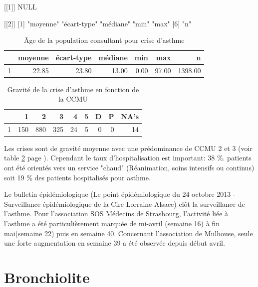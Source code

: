 \documentclass[12pt,english,french,twoside]{book}\usepackage[]{graphicx}\usepackage[]{color}
\begin{document}
[[1]]
NULL

[[2]]
[1] "moyenne"    "écart-type" "médiane"    "min"        "max"       
[6] "n"         

\begin{table}[ht]
\centering
\begin{tabular}{rrrrrrr}
  \hline
 & moyenne & écart-type & médiane & min & max & n \\ 
  \hline
1 & 22.85 & 23.80 & 13.00 & 0.00 & 97.00 & 1398.00 \\ 
   \hline
\end{tabular}
\caption[Asthme et âge]{Âge de la population consultant pour crise d'asthme} 
\label{tab:age_asthme}
\end{table}
\begin{table}[ht]
\centering
\begin{tabular}{rrrrrrrrr}
  \hline
 & 1 & 2 & 3 & 4 & 5 & D & P & NA's \\ 
  \hline
1 & 150 & 880 & 325 &  24 &   5 &   0 &   0 &  14 \\ 
   \hline
\end{tabular}
\caption[Asthme et CCMU]{Gravité de la crise d'asthme en fonction de la CCMU} 
\label{tab:ccmu_asthme}
\end{table}


Les crises sont de gravité moyenne avec une prédominance de CCMU 2 et 3 (voir table \ref{tab:ccmu_asthme} page \pageref{tab:ccmu_asthme}).
Cependant le taux d'hospitalisation est important: 38 \%.
 patients ont été orientés vers un service "chaud" (Réanimation, soins intensifs ou continus) soit 19 \% des patients hospitalisés pour asthme.

Le bulletin épidémiologique (Le point épidémiologique du 24 octobre 2013 - Surveillance épidémiologique de la Cire Lorraine-Alsace) clôt la surveillance de l’asthme. Pour l’association SOS Médecins de Strasbourg, l’activité liée à l’asthme a été particulièrement marquée de mi-avril (semaine 16) à fin mai(semaine 22) puis en semaine 40. Concernant l’association de Mulhouse, seule une forte augmentation en semaine 39 a été observée depuis début avril.

\section{Bronchiolite}
\end{document}
